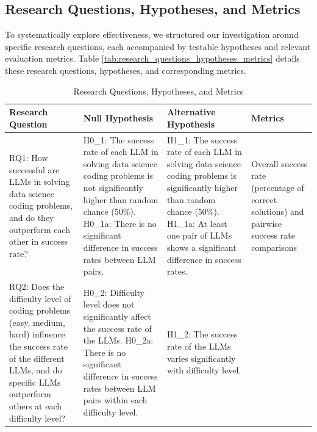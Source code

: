 \documentclass[conference]{IEEEtran}
\begin{document}

\subsection{Research Questions, Hypotheses, and Metrics}
To systematically explore effectiveness, we structured our investigation around specific research questions, each accompanied by testable hypotheses and relevant evaluation metrics. Table \ref{tab:research_questions_hypotheses_metrics} details these research questions, hypotheses, and corresponding metrics.


\begin{table}[!ht]
\centering
\caption{Research Questions, Hypotheses, and Metrics}
\begin{tabular}{|p{5.2cm}|p{3.7cm}|p{3.7cm}|p{3.7cm}|}
\hline
\textbf{Research Question} & \textbf{Null Hypothesis} & \textbf{Alternative Hypothesis} & \textbf{Metrics} \\
\hline
RQ1: How successful are LLMs in solving data science coding problems, and do they outperform each other in success rate? & 
H0\_1: The success rate of each LLM in solving data science coding problems is not significantly higher than random chance (50\%). \newline 
H0\_1a: There is no significant difference in success rates between LLM pairs. & 
H1\_1: The success rate of each LLM in solving data science coding problems is significantly higher than random chance (50\%). \newline
H1\_1a: At least one pair of LLMs shows a significant difference in success rates. & 
Overall success rate (percentage of correct solutions) and pairwise success rate comparisons \\
\hline
RQ2: Does the difficulty level of coding problems (easy, medium, hard) influence the success rate of the different LLMs, and do specific LLMs outperform others at each difficulty level? & 
H0\_2: Difficulty level does not significantly affect the success rate of the LLMs. \newline
H0\_2a: There is no significant difference in success rates between LLM pairs within each difficulty level. & 
H1\_2: The success rate of the LLMs varies significantly with difficulty level. \newline

\end{tabular}
\end{table}
\end{document}
